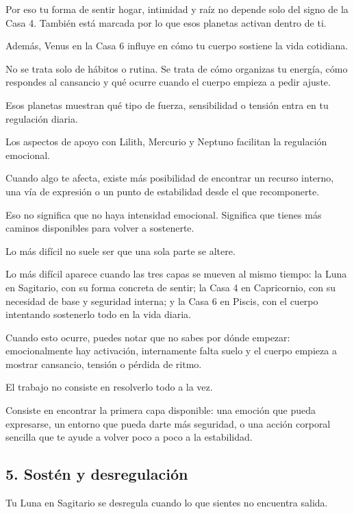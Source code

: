 \documentclass[11pt,a4paper]{article}
\begin{document}
Por eso tu forma de sentir hogar, intimidad y raíz no depende solo del signo de la Casa 4. También está marcada por lo que esos planetas activan dentro de ti.

Además, Venus en la Casa 6 influye en cómo tu cuerpo sostiene la vida cotidiana.

No se trata solo de hábitos o rutina. Se trata de cómo organizas tu energía, cómo respondes al cansancio y qué ocurre cuando el cuerpo empieza a pedir ajuste.

Esos planetas muestran qué tipo de fuerza, sensibilidad o tensión entra en tu regulación diaria.

Los aspectos de apoyo con Lilith, Mercurio y Neptuno facilitan la regulación emocional.

Cuando algo te afecta, existe más posibilidad de encontrar un recurso interno, una vía de expresión o un punto de estabilidad desde el que recomponerte.

Eso no significa que no haya intensidad emocional. Significa que tienes más caminos disponibles para volver a sostenerte.

Lo más difícil no suele ser que una sola parte se altere.

Lo más difícil aparece cuando las tres capas se mueven al mismo tiempo:
la Luna en Sagitario, con su forma concreta de sentir;
la Casa 4 en Capricornio, con su necesidad de base y seguridad interna;
y la Casa 6 en Piscis, con el cuerpo intentando sostenerlo todo en la vida diaria.

Cuando esto ocurre, puedes notar que no sabes por dónde empezar: emocionalmente hay activación, internamente falta suelo y el cuerpo empieza a mostrar cansancio, tensión o pérdida de ritmo.

El trabajo no consiste en resolverlo todo a la vez.

Consiste en encontrar la primera capa disponible: una emoción que pueda expresarse, un entorno que pueda darte más seguridad, o una acción corporal sencilla que te ayude a volver poco a poco a la estabilidad.

\vspace{0.8cm}

\subsection{5. Sostén y desregulación}

Tu Luna en Sagitario se desregula cuando lo que sientes no encuentra salida.
\end{document}
